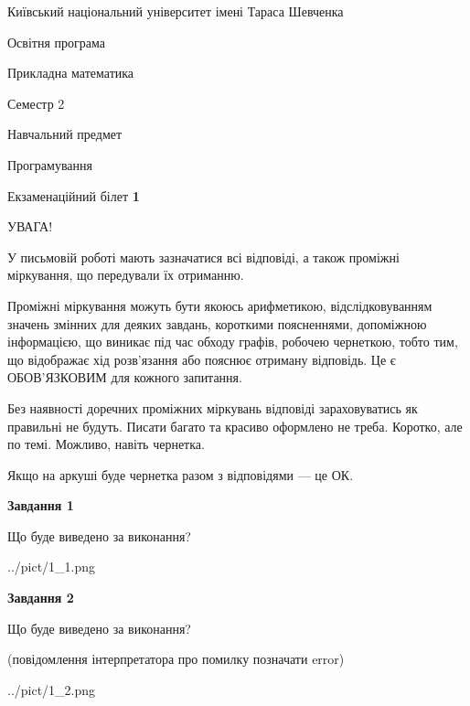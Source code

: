 \documentclass[12pt, ukrainian]{article}
\begin{document}
{{\begin {small}\par
{ \center  Київський національний університет імені Тараса Шевченка \par}
{\parbox {5 cm}{Освітня програма \hfill}{\parbox {7 cm}{Прикладна математика\hfill}}\parbox {6 cm}{\hfill Семестр 2}}\par
{\parbox {5 cm} {Навчальний предмет \hfill}\parbox {7 cm}{Програмування \hfill}\parbox {6cm}{\hfill}\par}\vspace{-7pt} \end{small}}{\center Екзаменаційний білет \No \textbf
{ 1 }\par}}
{
\begin {large}
УВАГА!

У письмовій роботі мають зазначатися всі відповіді, а також проміжні міркування, що передували їх отриманню.

Проміжні міркування можуть бути якоюсь арифметикою, відслідковуванням зна\-чень змінних для деяких завдань,
короткими поясненнями, допоміжною інформацією, що виникає під час обходу графів, робочею чернеткою,
тобто тим, що відображає хід розв’язання або пояснює отриману відповідь.
Це є ОБОВ’ЯЗКОВИМ для кожного запитання.

Без наявності доречних проміжних міркувань відповіді зараховуватись як правиль\-ні не будуть.
Писати багато та красиво оформлено не треба. Коротко, але по темі. Можли\-во, навіть чернетка.

Якщо на аркуші буде чернетка разом з відповідями --- це ОК.

\newpage

{\begin {center}\textbf{Завдання 1}\end {center}}\par
Що буде виведено за виконання?\par
\begin{center}
	{../pict/1_1.png}
\end{center}
\newpage

{\begin {center}\textbf{Завдання 2}\end {center}}\par
Що буде виведено за виконання?\par
 (повідомлення інтерпретатора про помилку позначати error)\par
\begin{center}
	{../pict/1_2.png}
\end{center}
\newpage


\end{large}}
\end{document}
